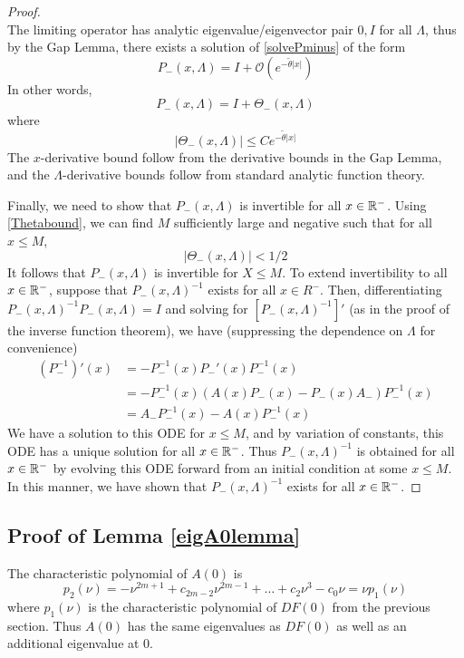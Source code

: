 \documentclass[thesis.tex]{subfiles}
\begin{document}
\begin{lemma}
\begin{proof}
\[\]
The limiting operator has analytic eigenvalue/eigenvector pair $0, I$ for all $\Lambda$, thus by the Gap Lemma, there exists a solution of \eqref{solvePminus} of the form 
\begin{equation*}
P_-(x, \Lambda) = I + \mathcal{O}(e^{-\tilde{\theta}|x|})
\end{equation*}
In other words, 
\begin{equation*}
P_-(x, \Lambda) = I + \Theta_-(x, \Lambda)
\end{equation*}
where 
\begin{equation}\label{Thetabound}
|\Theta_-(x, \Lambda)| \leq C e^{-\tilde{\theta}|x|}
\end{equation}
The $x$-derivative bound follow from the derivative bounds in the Gap Lemma, and the $\Lambda$-derivative bounds follow from standard analytic function theory.

Finally, we need to show that $P_-(x, \Lambda)$ is invertible for all $x \in {\mathbb R}^-$. Using \eqref{Thetabound}, we can find $M$ sufficiently large and negative such that for all $x \leq M$,
\[
|\Theta_-(x, \Lambda)| < 1/2
\]
It follows that $P_-(x, \Lambda)$ is invertible for $X \leq M$. To extend invertibility to all $x \in {\mathbb R}^-$, suppose that $P_-(x, \Lambda)^{-1}$ exists for all $x \in R^-$. Then, differentiating $P_-(x, \Lambda)^{-1} P_-(x, \Lambda) = I$ and solving for $[P_-(x, \Lambda)^{-1}]'$ (as in the proof of the inverse function theorem), we have (suppressing the dependence on $\Lambda$ for convenience)
\begin{align*}
(P_-^{-1})'(x) &= -P_-^{-1}(x)P_-'(x)P_-^{-1}(x) \\
&= -P_-^{-1}(x)( A(x)P_-(x) - P_-(x) A_-)P_-^{-1}(x) \\
&= A_- P_-^{-1}(x) - A(x) P_-^{-1}(x)
\end{align*}
We have a solution to this ODE for $x \leq M$, and by variation of constants, this ODE has a unique solution for all $x \in {\mathbb R}^-$. Thus $P_-(x, \Lambda)^{-1}$ is obtained for all $x \in {\mathbb R}^-$ by evolving this ODE forward from an initial condition at some $x \leq M$. In this manner, we have shown that $P_-(x, \Lambda)^{-1}$ exists for all $x \in {\mathbb R}^-$.
\end{proof}
\end{lemma}

\subsection{Proof of Lemma \ref{eigA0lemma}}
The characteristic polynomial of $A(0)$ is 
\begin{equation}\label{charpolyA0}
p_2(\nu) = -\nu^{2m+1} + c_{2m-2} \nu^{2m-1} + \dots + c_2 \nu^3 - c_0 \nu = \nu p_1(\nu)
\end{equation}
where $p_1(\nu)$ is the characteristic polynomial of $DF(0)$ from the previous section. Thus $A(0)$ has the same eigenvalues as $DF(0)$ as well as an additional eigenvalue at 0.
\end{document}
